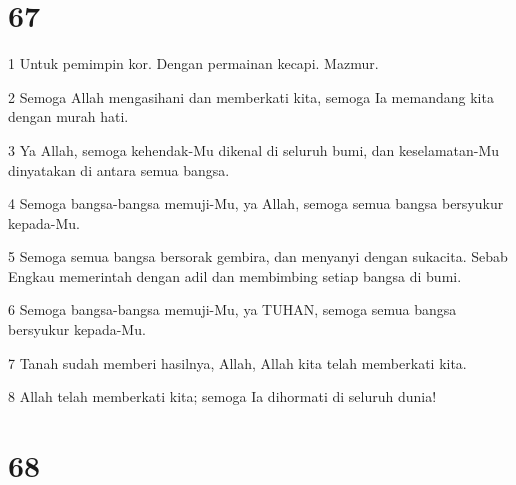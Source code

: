 \chapter{67}

\par 1 Untuk pemimpin kor. Dengan permainan kecapi. Mazmur.
\par 2 Semoga Allah mengasihani dan memberkati kita, semoga Ia memandang kita dengan murah hati.
\par 3 Ya Allah, semoga kehendak-Mu dikenal di seluruh bumi, dan keselamatan-Mu dinyatakan di antara semua bangsa.
\par 4 Semoga bangsa-bangsa memuji-Mu, ya Allah, semoga semua bangsa bersyukur kepada-Mu.
\par 5 Semoga semua bangsa bersorak gembira, dan menyanyi dengan sukacita. Sebab Engkau memerintah dengan adil dan membimbing setiap bangsa di bumi.
\par 6 Semoga bangsa-bangsa memuji-Mu, ya TUHAN, semoga semua bangsa bersyukur kepada-Mu.
\par 7 Tanah sudah memberi hasilnya, Allah, Allah kita telah memberkati kita.
\par 8 Allah telah memberkati kita; semoga Ia dihormati di seluruh dunia!

\chapter{68}

